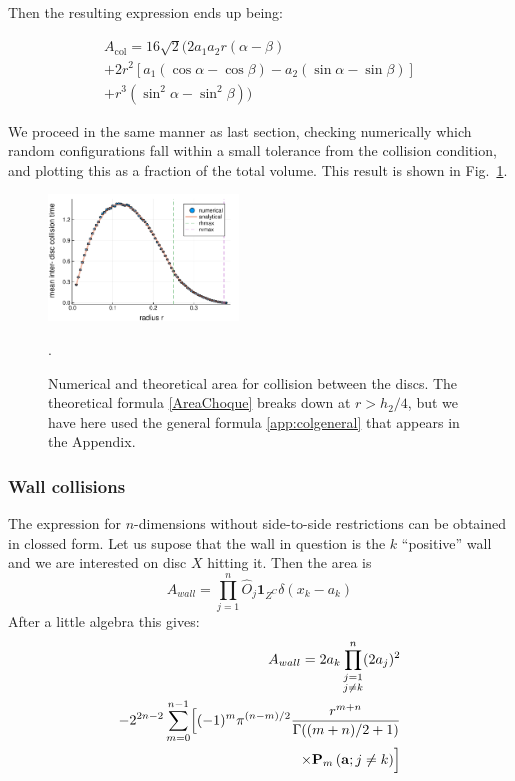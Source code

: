 \documentclass[superscriptaddress,pre,reprint,showpacs,twocolumn]{revtex4-1}
\newcommand{\sumprod}[1]{\mathbf{P}_{#1} \,}
\begin{document}
Then the resulting expression ends up being:
 
\begin{equation}\label{colgeneral}
  \begin{split}
  A_\text{col}  = 16\sqrt{2} \bigl( 2a_1a_2r(\alpha-\beta)
 \\ + 2r^2 [a_1 (\cos \alpha-\cos\beta) -a_2 (\sin\alpha -\sin\beta)]
 \\ + r^3(\sin^2 \alpha -\sin^2\beta) \bigr)
  \end{split}
\end{equation}
 

We proceed in the same manner as last section, checking numerically which
random configurations
fall within a small tolerance from the collision condition, and
plotting this as a fraction of the total volume.
This result is shown in Fig.~\ref{AreaChoqueTeoyNum}. 
\begin{figure}
\centering
\includegraphics[width=0.45\textwidth]{./figures/areaCol01.pdf}
\caption{Numerical and theoretical area 
for collision between the discs.  The theoretical formula 
\eqref{AreaChoque} breaks down at
$r > h_2/4$, but we have here used the general formula \eqref{app:colgeneral}
that appears in the Appendix.}
\label{AreaChoqueTeoyNum}.
\end{figure}


\subsubsection{Wall collisions}

The expression for $n$-dimensions without side-to-side restrictions can
be obtained in clossed form. Let us supose that the wall in question
is the $k$ ``positive'' wall and we are interested on disc $X$ hitting
it. Then the area is
\begin{equation}
A_{wall} = \prod_{j=1}^n \hat{O}_j \mathbf{1}_{Z^C} \delta(x_k-a_k)
\end{equation}
After a little algebra this gives:
\begin{equation}
  \begin{split}
    A_{wall} = 2a_k\prod_{ \substack{ j=1\\ j\neq k}}^n (2a_j)^2
    \\ - 2^{2n-2} \sum_{m=0}^{n-1} \Bigr[
      (-1)^m \pi^{ (n-m)/2} \frac{r^{m+n}}{\Gamma((m+n)/2+1)}
    \\  \times 
  \sumprod{m} (\mathbf{a}; j\neq k) \Bigl]
  \end{split}
  \end{equation}
\end{document}
